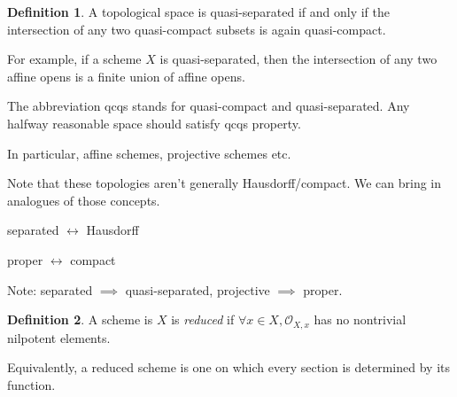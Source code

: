 \documentclass{article}
\theoremstyle{definition}
\newtheorem*{definition}{Definition}
\begin{document}
    \begin{definition}
        A topological space is quasi-separated if and only if the intersection of any two quasi-compact subsets is again quasi-compact.
    \end{definition}

    For example, if a scheme \(X\) is quasi-separated, then the intersection of any two affine opens is a finite union of affine opens.

    The abbreviation qcqs stands for quasi-compact and quasi-separated. Any halfway reasonable space should satisfy qcqs property.

    In particular, affine schemes, projective schemes etc.

    Note that these topologies aren't generally Hausdorff/compact. We can bring in analogues of those concepts.

    separated \(\leftrightarrow\) Hausdorff

    proper \(\leftrightarrow\) compact

    Note: separated \(\implies\) quasi-separated, projective \(\implies\) proper.

    \begin{definition}
        A scheme is \(X\) is \textit{reduced} if \(\forall x\in X, \mathcal{O}_{X,x}\) has no nontrivial nilpotent elements.

        Equivalently, a reduced scheme  is one on which every section is determined by its function.
    \end{definition}
\end{document}
